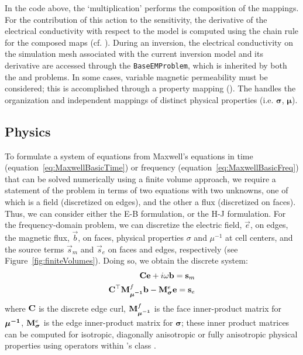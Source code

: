 In the code above, the `multiplication' performs the composition of the
mappings. For the contribution of this action to the sensitivity, the
derivative of the electrical conductivity with respect to the model is
computed using the chain rule for the composed maps (cf. \cite{Kang2015,
Heagy2014a}). During an inversion, the electrical conductivity on the
simulation mesh associated with the current inversion model and its derivative
are accessed through the \texttt{BaseEMProblem}, which is inherited by both
the \TDEM and \FDEM problems. In some cases, variable magnetic permeability
must be considered; this is accomplished through a property mapping
(\PropMap). The \PropMap handles the organization and independent mappings of
distinct physical properties (i.e. $\boldsymbol{\sigma}$, $\boldsymbol{\mu}$).



\subsection{Physics}
\label{sec:Physics}


To formulate a system of equations from Maxwell's equations in time
(equation~\ref{eq:MaxwellBasicTime}) or frequency
(equation~\ref{eq:MaxwellBasicFreq}) that can be solved numerically using a
finite volume approach, we require a statement of the problem in terms of two
equations with two unknowns, one of which is a field (discretized on edges),
and the other a flux (discretized on faces). Thus, we can consider either the
E-B formulation, or the H-J formulation. For the frequency-domain problem, we
can discretize the electric field, $\vec{e}$, on edges, the magnetic flux,
$\vec{b}$, on faces, physical properties $\sigma$ and $\mu^{-1}$ at cell
centers, and the source terms $\vec{s}_m$ and $\vec{s}_e$ on faces and edges,
respectively (see Figure~\ref{fig:finiteVolumes}). Doing so, we obtain the
discrete system:
\begin{equation}
    \begin{split}
        {\mathbf C} \mathbf{e} + i\omega\mathbf{b} = \mathbf{s}_m \\
        {\mathbf C}^\top {{\mathbf M}^f_{\boldsymbol{\mu^{-1}}}} \mathbf{b} - {{\mathbf M}^e_{\boldsymbol{\sigma}}} \mathbf{e} = \mathbf{s}_e
    \end{split}
    \label{eq:EB_FDEM}
\end{equation}
where ${\mathbf C}$ is the discrete edge curl, ${{\mathbf M}^f_{\boldsymbol{\mu^{-1}}}}$ is the face inner-product
matrix for $\boldsymbol{\mu^{-1}}$, ${{\mathbf M}^e_{\boldsymbol{\sigma}}}$ is the edge inner-product matrix
for $\boldsymbol{\sigma}$; these inner product matrices can be computed for
isotropic, diagonally anisotropic or fully anisotropic physical properties
using operators within \SimPEG's \Mesh class \citep{Cockett2015, FV_Tutorial}.

